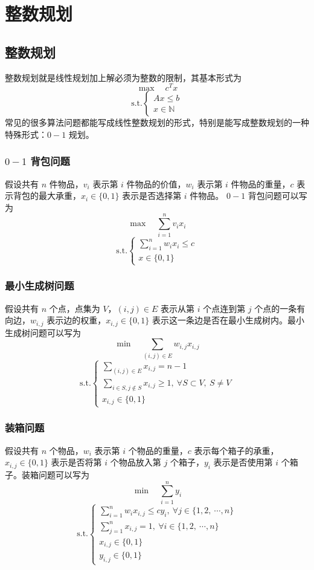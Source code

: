 \section{整数规划}
\subsection{整数规划}
整数规划就是线性规划加上解必须为整数的限制，其基本形式为
$$
\max \quad c^Tx
$$
$$
\text{s.t.} 
\begin{cases}
    Ax \le b \\
    x \in \mathbb{N}
\end{cases}
$$
常见的很多算法问题都能写成线性整数规划的形式，特别是能写成整数规划的一种特殊形式：$0 - 1$ 规划。

\subsubsection{$0 - 1$ 背包问题}
假设共有 $n$ 件物品，$v_i$ 表示第 $i$ 件物品的价值，$w_i$ 表示第 $i$ 件物品的重量，$c$ 表示背包的最大承重，$x_i \in \{0, 1\}$ 表示是否选择第 $i$ 件物品。 $0-1$ 背包问题可以写为
$$
\max \quad \sum_{i = 1}^n v_ix_i
$$
$$
\text{s.t.} 
\begin{cases}
    \sum_{i = 1}^n w_ix_i \le c \\
    x \in \{0, 1\}
\end{cases}
$$

\subsubsection{最小生成树问题}
假设共有 $n$ 个点，点集为 $V$，$(i, j) \in E$ 表示从第 $i$ 个点连到第 $j$ 个点的一条有向边，$w_{i, j}$ 表示边的权重，$x_{i, j} \in \{0, 1\}$ 表示这一条边是否在最小生成树内。最小生成树问题可以写为 \\
$$
\min \quad \sum_{(i, j) \in E} w_{i, j}x_{i, j}
$$
$$
\text{s.t.} 
\begin{cases}
    \sum_{(i, j) \in E} x_{i, j} = n - 1 \\
    \sum_{i \in S, j \notin S} x_{i, j} \ge 1, \ \forall S \subset V, \ S \ne V\\
    x_{i, j} \in \{0, 1\}
\end{cases}
$$

\subsubsection{装箱问题}
假设共有 $n$ 个物品，$w_i$ 表示第 $i$ 个物品的重量，$c$ 表示每个箱子的承重，$x_{i, j} \in \{0, 1\}$ 表示是否将第 $i$ 个物品放入第 $j$ 个箱子，$y_i$ 表示是否使用第 $i$ 个箱子。装箱问题可以写为
$$
\min \quad \sum_{i = 1}^n y_i
$$
$$
\text{s.t.} 
\begin{cases}
    \sum_{i = 1}^n w_ix_{i, j} \le cy_i, \ \forall j \in \{1, 2, \ \cdots, n\} \\
    \sum_{j = 1}^n x_{i, j} = 1, \ \forall i \in \{1, 2, \ \cdots, n\} \\
    x_{i, j} \in \{0, 1\} \\
    y_{i, j} \in \{0, 1\} 
\end{cases}
$$


